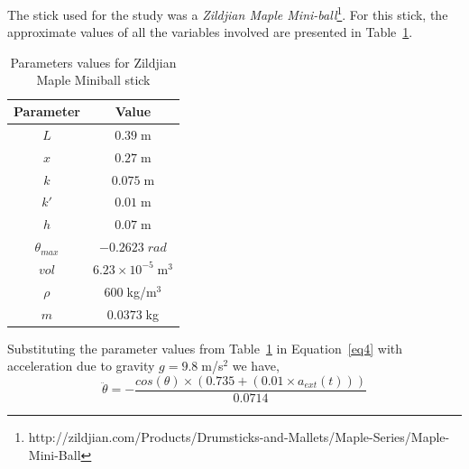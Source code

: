 \documentclass[final,1p,times]{elsarticle}
\begin{document}
The stick used for the study was a \textit{Zildjian Maple Mini-ball}\footnote{http://zildjian.com/Products/Drumsticks-and-Mallets/Maple-Series/Maple-Mini-Ball}. For this stick, the approximate values of all the variables involved are presented in Table~\ref{table:Table1}.
\begin{table}
	\caption{Parameters values for Zildjian Maple Miniball stick}
	\vspace{0.3cm}
	\centering
	\begin{tabular}{c c}
		\hline\hline
		\textbf{Parameter} & \textbf{Value}\\
		\hline
		$L$ & $0.39\;$m\\
		\hline
		$x$ & $0.27\;$m\\
		\hline
		$k$ & $0.075\;$m\\
		\hline
		$k'$ & $0.01\;$m\\
		\hline
		$h$ & $0.07\;$m \\ 
		\hline
		$\theta_{max}$ & $-0.2623\;rad$\\
		\hline
		$vol$ & $6.23\times10^{-5}\;$m$^3$\\
		\hline
		$\rho$ & $600\;$kg/m$^3$\\
		\hline
		$m$ & $0.0373\;$kg\\
		\hline
		
	\end{tabular}
	\label{table:Table1}
\end{table}
Substituting the parameter values from Table~\ref{table:Table1} in Equation~\ref{eq4} with acceleration due to gravity $g = 9.8\;$m/s$^2$ we have,
\begin{equation} \label{eq7}
\ddot{\theta} = -\frac{cos(\theta)\times(0.735+(0.01\times a_{ext}(t)))}{0.0714}
\end{equation}
\end{document}
